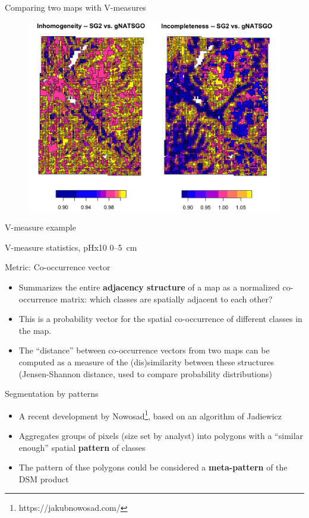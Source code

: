 \documentclass[aspectratio=169]{beamer}
\begin{document}
\begin{frame}{Comparing two maps with V-measures}
    \begin{figure}
        \centering        \includegraphics[height=0.72\textheight]{graphics_david/Fig16.png}
    \end{figure}
\end{frame}


\begin{frame}{V-measure example}
   
\par
V-measure statistics, pHx10 0--5~cm
\end{frame}

\begin{frame}{Metric: Co-occurrence vector}
  \begin{itemize}
  \item 
    Summarizes the entire \textbf{adjacency structure} of a map as a    normalized co-occurrence matrix: which classes are spatially adjacent to each other?
  \item
    This is a probability vector for the spatial co-occurrence of
    different    classes in the map.
    \item
    The ``distance'' between co-occurrence vectors from two maps can be computed   as a measure of the (dis)similarity between these structures
    (Jensen-Shannon distance, used to compare probability distributions)
  \end{itemize}
\end{frame}

\begin{frame}{Segmentation by patterns}
\begin{itemize}
    \item 
A recent development by Nowosad\footnote{https://jakubnowosad.com/}, based on an algorithm of Jadiewicz    
\item Aggregates groups of pixels (size set by analyst) into polygons with a ``similar enough'' spatial \textbf{pattern} of classes
\item The pattern of thse polygons could be considered a \textbf{meta-pattern} of the DSM product
\end{itemize}
\end{frame}
\end{document}
